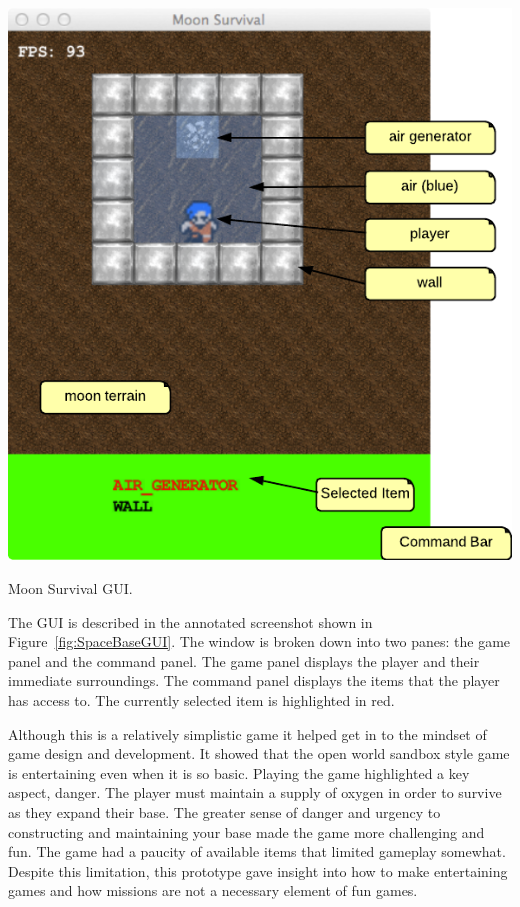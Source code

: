 \begin{marginfigure}
	\includegraphics{res/space_base_prototype/MoonSurvivalGUI.pdf}
	\caption[Moon Survival GUI]{Moon Survival GUI.}
	\label{fig:SpaceBaseGUI}
\end{marginfigure}

The GUI is described in the annotated screenshot shown in Figure~\ref{fig:SpaceBaseGUI}. The window is broken down into two panes: the game panel and the command panel. The game panel displays the player and their immediate surroundings. The command panel displays the items that the player has access to. The currently selected item is highlighted in red.

Although this is a relatively simplistic game it helped get in to the mindset of game design and development. It showed that the open world sandbox style game is entertaining even when it is so basic. Playing the game highlighted a key aspect, danger. The player must maintain a supply of oxygen in order to survive as they expand their base. The greater sense of danger and urgency to constructing and maintaining your base made the game more challenging and fun. The game had a paucity of available items that limited gameplay somewhat. Despite this limitation, this prototype gave insight into how to make entertaining games and how missions are not a necessary element of fun games. 
